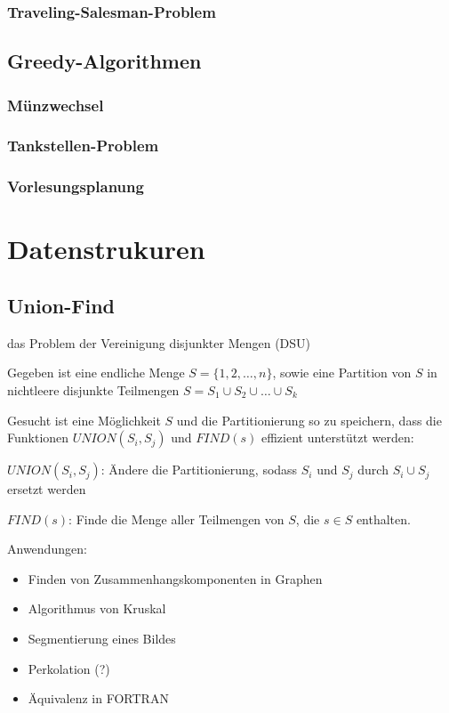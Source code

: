 \subsubsection{Traveling-Salesman-Problem}


\subsection{Greedy-Algorithmen}

\subsubsection{Münzwechsel}
\subsubsection{Tankstellen-Problem}
\subsubsection{Vorlesungsplanung}


\section{Datenstrukuren}

\subsection{Union-Find}

das Problem der Vereinigung disjunkter Mengen (DSU)

Gegeben ist eine endliche Menge $S = \{1, 2, \ldots, n\}$, sowie eine Partition
von $S$ in nichtleere disjunkte Teilmengen
$S = S_1 \cup S_2 \cup \ldots \cup S_k$

Gesucht ist eine Möglichkeit $S$ und die Partitionierung so zu speichern, dass
die Funktionen $UNION(S_i, S_j)$ und $FIND(s)$ effizient unterstützt werden:

$UNION(S_i, S_j)$: Ändere die Partitionierung, sodass $S_i$ und $S_j$ durch
$S_i \cup S_j$ ersetzt werden

$FIND(s)$: Finde die Menge aller Teilmengen von $S$, die $s \in S$ enthalten.

Anwendungen:
\begin{itemize}
\item Finden von Zusammenhangskomponenten in Graphen
\item Algorithmus von Kruskal
\item Segmentierung eines Bildes
\item Perkolation (?)
\item Äquivalenz in FORTRAN
\end{itemize}

